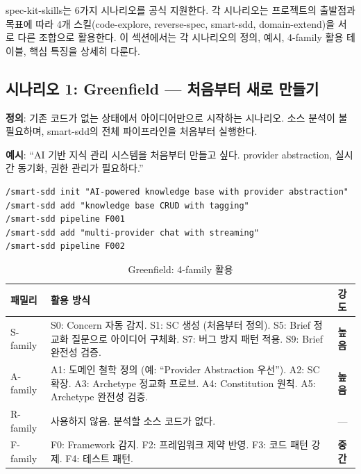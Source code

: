 \documentclass[11pt,a4paper,openright,twoside]{report}
\begin{document}
spec-kit-skills는 6가지 시나리오를 공식 지원한다. 각 시나리오는 프로젝트의 출발점과 목표에 따라 4개 스킬(code-explore, reverse-spec, smart-sdd, domain-extend)을 서로 다른 조합으로 활용한다. 이 섹션에서는 각 시나리오의 정의, 예시, 4-family 활용 테이블, 핵심 특징을 상세히 다룬다.


\subsection{시나리오 1: Greenfield --- 처음부터 새로 만들기}
\label{sec:ref-greenfield}

\textbf{정의}: 기존 코드가 없는 상태에서 아이디어만으로 시작하는 시나리오. 소스 분석이 불필요하며, smart-sdd의 전체 파이프라인을 처음부터 실행한다.

\textbf{예시}: ``AI 기반 지식 관리 시스템을 처음부터 만들고 싶다. provider abstraction, 실시간 동기화, 권한 관리가 필요하다.''

\begin{lstlisting}
/smart-sdd init "AI-powered knowledge base with provider abstraction"
/smart-sdd add "knowledge base CRUD with tagging"
/smart-sdd pipeline F001
/smart-sdd add "multi-provider chat with streaming"
/smart-sdd pipeline F002
\end{lstlisting}

\begin{table}[H]
\centering
\caption{Greenfield: 4-family 활용}
\label{tab:ref-greenfield}
\begin{tabularx}{\textwidth}{lXl}
\toprule
\textbf{패밀리} & \textbf{활용 방식} & \textbf{강도} \\
\midrule
S-family &
  S0: Concern 자동 감지. S1: SC 생성 (처음부터 정의). S5: Brief 정교화 질문으로 아이디어 구체화. S7: 버그 방지 패턴 적용. S9: Brief 완전성 검증. &
  \textbf{높음} \\
\addlinespace
A-family &
  A1: 도메인 철학 정의 (예: ``Provider Abstraction 우선''). A2: SC 확장. A3: Archetype 정교화 프로브. A4: Constitution 원칙. A5: Archetype 완전성 검증. &
  \textbf{높음} \\
\addlinespace
R-family &
  사용하지 않음. 분석할 소스 코드가 없다. &
  --- \\
\addlinespace
F-family &
  F0: Framework 감지. F2: 프레임워크 제약 반영. F3: 코드 패턴 강제. F4: 테스트 패턴. &
  \textbf{중간} \\
\bottomrule
\end{tabularx}
\end{table}
\end{document}
